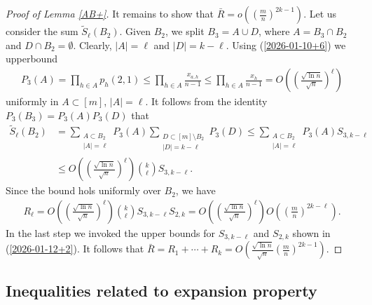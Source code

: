\documentclass[11pt, a4paper]{article}
\begin{document}
\begin{proof}[ Proof of Lemma \ref{AB+}]
It remains to show that ${\bar R}=o
\left(
\left(\frac{m}{n}\right)^{2k-1}
\right)$. Let us consider the sum
${\tilde S}_\ell(B_2)$.
Given $B_2$, we split $B_3=A\cup D$, 
where $A=B_3\cap B_2$  and $D\cap B_2=\emptyset$.
Clearly, $|A|=\ell$ 
and  $|D|=k-\ell$. 
Using (\ref{2026-01-10+6}) we upperbound
\begin{align*}
P_3(A)
=
\prod_{h\in A}p_h(2,1)
\le 
\prod_{h\in A}\frac{x_{a,h}}{n-1}
\le 
\prod_{h\in A}\frac{x_{h}}{n-1}
=
O
\left(
\left(
\frac{\sqrt{\ln n}}{\sqrt{n}}
\right)^\ell
\right)
\end{align*}
 uniformly in $A\subset [m]$, $|A|=\ell$. 
 It follows from the identity $P_3(B_3)=P_3(A)P_3(D)$
 that
\begin{align*}
{\tilde S}_\ell(B_2)
&
=
\sum_{\substack{A\subset B_2\\
|A|=\ell}}
P_3(A)
\sum_{\substack{D\subset [m]\setminus B_2\\
|D|=k-\ell}}
P_3(D)
\le
\sum_{\substack{A\subset B_2\\
|A|=\ell}}
P_3(A)
S_{3,k-\ell}
\\
&
\le 
O
\left(
\left(
\frac{\sqrt{\ln n}}{\sqrt{n}}
\right)^\ell
\right)
\binom{k}{\ell}
S_{3,k-\ell}.
\end{align*}
Since the bound hols uniformly over $B_2$, we have
\begin{align*}
R_\ell
=
O
\left(
\left(
\frac{\sqrt{\ln n}}{\sqrt{n}}
\right)^\ell
\right)
\binom{k}{\ell}
S_{3,k-\ell}
S_{2,k}
=
O
\left(
\left(
\frac{\sqrt{\ln n}}{\sqrt{n}}
\right)^\ell
\right)
O\left(\left(\frac{m}{n}\right)^{2k-\ell}
\right).
\end{align*}
In the last step we invoked the upper bounds for $S_{3,k-\ell}$ 
and
$S_{2,k}$ 
shown in (\ref{2026-01-12+2}).
It follows that ${\bar R}=R_1+\cdots+R_k=O
\left(
\frac{\sqrt{\ln n}}{\sqrt{n}}
\left(\frac{m}{n}\right)^{2k-1}
\right)$.
\end{proof}









\subsection{Inequalities related to expansion property}
\end{document}
